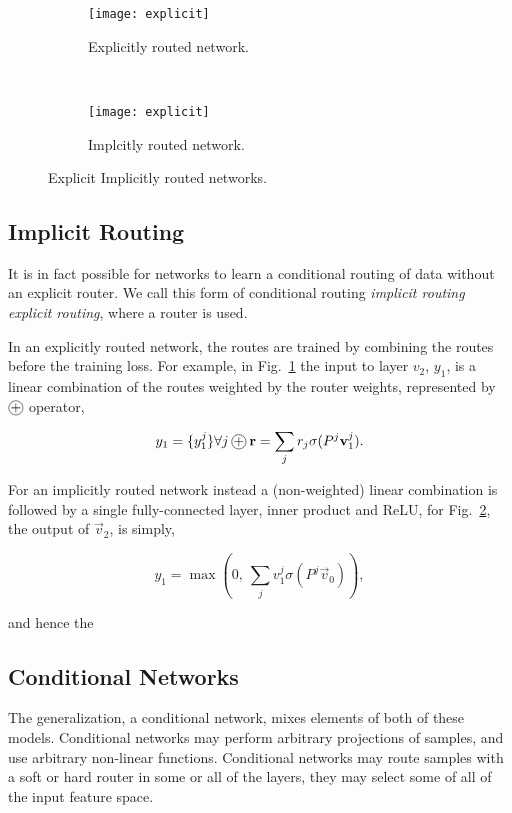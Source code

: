 \documentclass[thesis]{subfiles}
\begin{document}
	
	\begin{figure}[tbp] 
		\centering
		\begin{subfigure}[b]{0.45\textwidth}
			\centering
			\texttt{[image: explicit]}
			\caption{Explicitly routed network.}
			\label{fig:explicitRouter}
		\end{subfigure}
		~
		\begin{subfigure}[b]{0.45\textwidth}
			\centering
			\texttt{[image: explicit]}
			\caption{Implcitly routed network.}
			\label{fig:implicitRouter}
		\end{subfigure}
		\caption{Explicit \vs Implicitly routed networks.}
		\label{fig:routerConnections}
	\end{figure}
	
	\subsection{Implicit Routing}
	It is in fact possible for networks to learn a conditional routing of data without an explicit router. We call this form of conditional routing \emph{implicit routing} \vs \emph{explicit routing}, where a router is used. 
	
	In an explicitly routed network, the routes are trained by combining the routes before the training loss. For example, in Fig.~\ref{fig:explicitRouter} the input to layer $v_2$, $y_1$, is a linear combination of the routes weighted by the router weights, represented by $\circleplus$ operator,
	
	\begin{equation}
	y_1 = \{y_1^j\} \forall j\circleplus \vec r = \sum_j r_j \sigma(P^j \vec v_1^j ).
	\end{equation}
	
	For an implicitly routed network instead a (non-weighted) linear combination is followed by a single fully-connected layer, \ie inner product and ReLU, \ie for Fig.~\ref{fig:implicitRouter}, the output of $\vec v_2$,  is simply,
	
	\begin{equation}
	y_1 = \max (0, ~\sum_j v_1^j \sigma(P^j \vec v_0) ), 
	\end{equation}
	
	and hence the 
	
	\subsection{Conditional Networks}
	The generalization, a conditional network, mixes elements of both of these models. Conditional networks may perform arbitrary projections of samples, and use arbitrary non-linear functions. Conditional networks may route samples with a soft or hard router in some or all of the layers, they may select some of all of the input feature space. 
	
\end{document}
